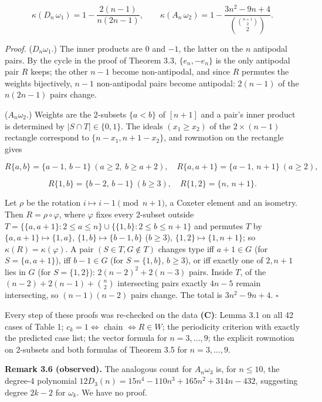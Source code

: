 \documentclass[
]{article}
\begin{document}
\[\kappa(D_n\,\omega_1) = 1 - \frac{2(n-1)}{n(2n-1)}, \qquad \kappa(A_n\,\omega_2) = 1 - \frac{3n^2 - 9n + 4}{\binom{\binom{n+1}{2}}{2}} .\]

\emph{Proof.} (\(D_n\omega_1\).) The inner products are \(0\) and
\(-1\), the latter on the \(n\) antipodal pairs. By the cycle in the
proof of Theorem 3.3, \(\{e_n, -e_n\}\) is the only antipodal pair \(R\)
keeps; the other \(n-1\) become non-antipodal, and since \(R\) permutes
the weights bijectively, \(n-1\) non-antipodal pairs become antipodal:
\(2(n-1)\) of the \(n(2n-1)\) pairs change.

(\(A_n\omega_2\).) Weights are the 2-subsets \(\{a < b\}\) of \([n+1]\)
and a pair's inner product is determined by \(|S \cap T| \in \{0,1\}\).
The ideals \((x_1 \ge x_2)\) of the \(2 \times (n-1)\) rectangle
correspond to \(\{n - x_1, n+1-x_2\}\), and rowmotion on the rectangle
gives

\[R\{a,b\} = \{a-1,\, b-1\} \ (a \ge 2,\ b \ge a+2), \quad R\{a,a+1\} = \{a-1,\, n+1\} \ (a \ge 2),\]

\[R\{1,b\} = \{b-2,\, b-1\} \ (b \ge 3), \quad R\{1,2\} = \{n,\, n+1\} .\]

Let \(\rho\) be the rotation \(i \mapsto i-1 \pmod{n+1}\), a Coxeter
element and an isometry. Then \(R = \rho \circ \varphi\), where
\(\varphi\) fixes every 2-subset outside
\(T = \{\{a,a+1\} : 2 \le a \le n\} \cup \{\{1,b\} : 2 \le b \le n+1\}\)
and permutes \(T\) by \(\{a,a+1\} \mapsto \{1,a\}\),
\(\{1,b\} \mapsto \{b-1,b\}\) (\(b \ge 3\)),
\(\{1,2\} \mapsto \{1,n+1\}\); so \(\kappa(R) = \kappa(\varphi)\). A
pair \((S \in T, G \notin T)\) changes type iff \(a+1 \in G\) (for
\(S = \{a,a+1\}\)), iff \(b-1 \in G\) (for \(S = \{1,b\}\),
\(b \ge 3\)), or iff exactly one of \(2, n+1\) lies in \(G\) (for
\(S = \{1,2\}\)): \(2(n-2)^2 + 2(n-3)\) pairs. Inside \(T\), of the
\((n-2) + 2(n-1) + \binom{n}{2}\) intersecting pairs exactly \(4n-5\)
remain intersecting, so \((n-1)(n-2)\) pairs change. The total is
\(3n^2 - 9n + 4\). \(\square\)

Every step of these proofs was re-checked on the data \textbf{(C)}:
Lemma 3.1 on all 42 cases of Table 1; \(c_k = 1 \iff\) chain
\(\iff R \in W\); the periodicity criterion with exactly the predicted
case list; the vector formula for \(n = 3, \dots, 9\); the explicit
rowmotion on 2-subsets and both formulas of Theorem 3.5 for
\(n = 3, \dots, 9\).

\textbf{Remark 3.6 (observed).} The analogous count for \(A_n\omega_3\)
is, for \(n \le 10\), the degree-4 polynomial
\(12 D_3(n) = 15n^4 - 110n^3 + 165n^2 + 314n - 432\), suggesting degree
\(2k-2\) for \(\omega_k\). We have no proof.
\end{document}
